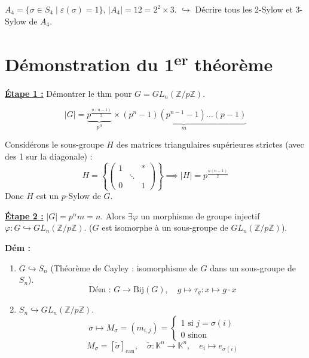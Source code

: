\begin{exemple}
$A_4 = \{ \sigma \in S_4 \mid \varepsilon(\sigma) = 1 \}$, $|A_4| = 12 = 2^2 \times 3$.
$\hookrightarrow$ Décrire tous les 2-Sylow et 3-Sylow de $A_4$.
\end{exemple}

\section*{Démonstration du 1\textsuperscript{er} théorème}

\underline{\textbf{Étape 1 :}} Démontrer le thm pour $G = GL_n(\mathbb{Z}/p\mathbb{Z})$.

\[ |G| = \underbrace{p^{\frac{n(n-1)}{2}}}_{p^\alpha} \times \underbrace{(p^n - 1)(p^{n-1}-1)\dots(p-1)}_{m} \]

Considérons le sous-groupe $H$ des matrices triangulaires supérieures strictes (avec des 1 sur la diagonale) :
\[ H = \left\{ \begin{pmatrix} 1 & & * \\ & \ddots & \\ 0 & & 1 \end{pmatrix} \right\} \implies |H| = p^{\frac{n(n-1)}{2}} \]
Donc $H$ est un $p$-Sylow de $G$.

\vspace{0.5cm}

\underline{\textbf{Étape 2 :}} $|G| = p^\alpha m = n$.
Alors $\exists \varphi$ un morphisme de groupe injectif $\varphi : G \hookrightarrow GL_n(\mathbb{Z}/p\mathbb{Z})$.
($G$ est isomorphe à un sous-groupe de $GL_n(\mathbb{Z}/p\mathbb{Z})$).

\textbf{Dém :}
\begin{enumerate}
    \item $G \hookrightarrow S_n$ (Théorème de Cayley : isomorphisme de $G$ dans un sous-groupe de $S_n$).
    \[ \text{Dém : } G \to \text{Bij}(G), \quad g \mapsto \tau_g : x \mapsto g \cdot x \]
    
    \item $S_n \hookrightarrow GL_n(\mathbb{Z}/p\mathbb{Z})$.
    \[ \sigma \longmapsto M_\sigma = (m_{i,j}) = \begin{cases} 1 \text{ si } j = \sigma(i) \\ 0 \text{ sinon} \end{cases} \]
    \[ M_\sigma = [\tilde{\sigma}]_{\text{can}}, \quad \tilde{\sigma} : \mathbb{K}^n \to \mathbb{K}^n, \quad e_i \mapsto e_{\sigma(i)} \]
\end{enumerate}
\hfill \faStop

